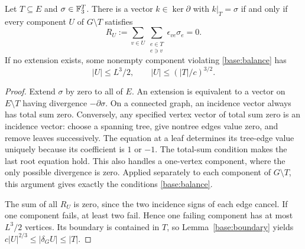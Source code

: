 \begin{lemma}
\label{base:partial-flow}
Let $T\subseteq E$ and $\sigma\in\mathbb F_3^T$.  There is a vector
$k\in\ker\partial$ with $k|_T=\sigma$ if and only if every component
$U$ of $G\setminus T$ satisfies
\begin{equation}
\label{base:balance}
 R_U:=\sum_{v\in U}\sum_{\substack{e\in T\\e\ni v}}
          \epsilon_{ve}\sigma_e=0.
\end{equation}
If no extension exists, some nonempty component violating
\eqref{base:balance} has
\[
 |U|\le L^3/2,
 \qquad |U|\le(|T|/c)^{3/2}.
\]
\end{lemma}
\begin{proof}
Extend $\sigma$ by zero to all of $E$.  An extension is equivalent to
a vector on $E\setminus T$ having divergence $-\partial\sigma$.
On a connected graph, an incidence vector always has total sum zero.
Conversely, any specified vertex vector of total sum zero is an
incidence vector: choose a spanning tree, give nontree edges value zero,
and remove leaves successively.  The equation at a leaf determines its
tree-edge value uniquely because its coefficient is $1$ or $-1$.
The total-sum condition makes the last root equation hold.  This also
handles a one-vertex component, where the only possible divergence is
zero.  Applied separately to each component of $G\setminus T$, this
argument gives exactly the conditions \eqref{base:balance}.

The sum of all $R_U$ is zero, since the two incidence signs of each
edge cancel.  If one component fails, at least two fail.  Hence one
failing component has at most $L^3/2$ vertices.  Its boundary is
contained in $T$, so Lemma~\ref{base:boundary} yields
$c|U|^{2/3}\le|\delta_G U|\le|T|$.
\end{proof}

